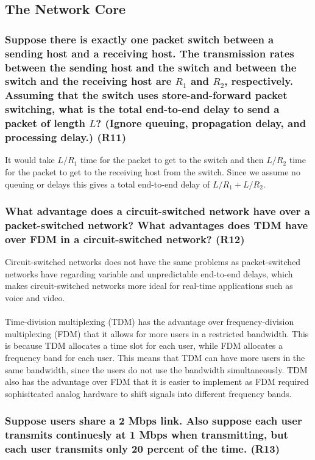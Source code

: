 \subsection{The Network Core}

\subsubsection{Suppose there is exactly one packet switch between a sending host and a receiving host. The transmission rates between the sending host and the switch and between the switch and the receiving host are $R_1$ and $R_2$, respectively. Assuming that the switch uses store-and-forward packet switching, what is the total end-to-end delay to send a packet of length $L$? (Ignore queuing, propagation delay, and processing delay.) (R11)}

It would take $L/R_1$ time for the packet to get to the switch and then $L/R_2$ time for the packet to get to the receiving host from the switch. Since we assume no queuing or delays this gives a total end-to-end delay of $L/R_1 + L/R_2$.

\subsubsection{What advantage does a circuit-switched network have over a packet-switched network? What advantages does TDM have over FDM in a circuit-switched network? (R12)}
Circuit-switched networks does not have the same problems as packet-switched networks have regarding variable and unpredictable end-to-end delays, which makes circuit-switched networks more ideal for real-time applications such as voice and video. \\
\\
Time-division multiplexing (TDM) has the advantage over frequency-division multiplexing (FDM) that it allows for more users in a restricted bandwidth. This is because TDM allocates a time slot for each user, while FDM allocates a frequency band for each user. This means that TDM can have more users in the same bandwidth, since the users do not use the bandwidth simultaneously. TDM also has the advantage over FDM that it is easier to implement as FDM required sophisitcated analog hardware to shift signals into different frequency bands.

\subsubsection{Suppose users share a 2 Mbps link. Also suppose each user transmits continuesly at 1 Mbps when transmitting, but each user transmits only 20 percent of the time. (R13)}

